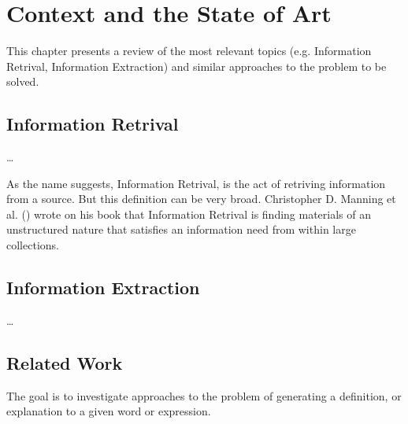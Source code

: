 
\chapter{Context and the State of Art}
\label{chap:Chapter2}

This chapter presents a review of the most relevant topics (e.g. Information Retrival, Information Extraction) and similar approaches to the problem to be solved.

\section{Information Retrival}

\dots

As the name suggests, Information Retrival, is the act of retriving information from a source.
But this definition can be very broad.
Christopher D. Manning et al. (\citeyear{Reference4}) wrote on his book that Information Retrival is finding materials of an unstructured nature that satisfies an information need from within large collections.

\section{Information Extraction}

\dots

\section{Related Work}

The goal is to investigate approaches to the problem of generating a definition, or explanation to a given word or expression.

